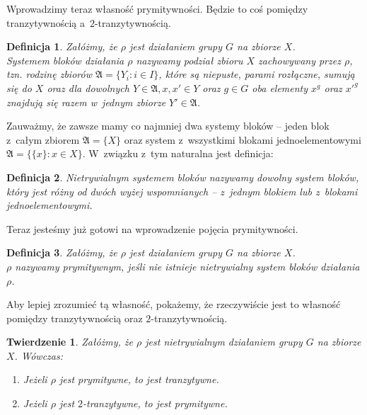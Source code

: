 \documentclass[licencjacka]{pracamgr}
\newtheorem{deff}{Definicja}[section]
\newtheorem{thh}{Twierdzenie}[section]
\begin{document}
Wprowadzimy teraz własność prymitywności. 
Będzie to coś pomiędzy tranzytywnością a~$2$-tranzytywnością.

\begin{deff}
	Załóżmy, że $\rho$ jest działaniem grupy $G$ na zbiorze $X$. \\
	\emph{Systemem bloków} działania $\rho$ nazywamy podział zbioru $X$ zachowywany przez $\rho$,
	tzn. rodzinę zbiorów $\mathfrak{A} = \{Y_i \colon i \in I \}$, które są niepuste, parami rozłączne, sumują się do $X$ 
	oraz dla dowolnych $Y \in \mathfrak{A}, x, x' \in Y$ oraz $g \in G$ 
	oba elementy $x^g$ oraz $x'^g$ znajdują się razem w~jednym zbiorze $Y' \in \mathfrak{A}$.
\end{deff}

Zauważmy, że zawsze mamy co najmniej dwa systemy bloków -- jeden blok z~całym zbiorem $\mathfrak{A} = \{X\}$
oraz system z~wszystkimi blokami jednoelementowymi $\mathfrak{A} = \{\{x\} \colon x \in X\}$.
W~związku z~tym naturalna jest definicja:

\begin{deff}
	\emph{Nietrywialnym systemem bloków} nazywamy dowolny system bloków, 
	który jest różny od dwóch wyżej wspomnianych -- z~jednym blokiem lub z~blokami jednoelementowymi.
\end{deff}

Teraz jesteśmy już gotowi na wprowadzenie pojęcia prymitywności.

\begin{deff}
	Załóżmy, że $\rho$ jest działaniem grupy $G$ na zbiorze $X$. \\
	\emph{$\rho$ nazywamy prymitywnym}, jeśli nie istnieje nietrywialny system bloków działania $\rho$.
\end{deff}

Aby lepiej zrozumieć tą własność, pokażemy, że rzeczywiście jest to własność pomiędzy tranzytywnością oraz $2$-tranzytywnością.

\begin{thh}
	Załóżmy, że $\rho$ jest nietrywialnym działaniem grupy $G$ na zbiorze $X$. Wówczas:
	\begin{enumerate}[label=\alph*)]
	 \item Jeżeli $\rho$ jest prymitywne, to jest tranzytywne.
	 \item Jeżeli $\rho$ jest $2$-tranzytywne, to jest prymitywne.
	\end{enumerate}
\end{thh}
\end{document}
